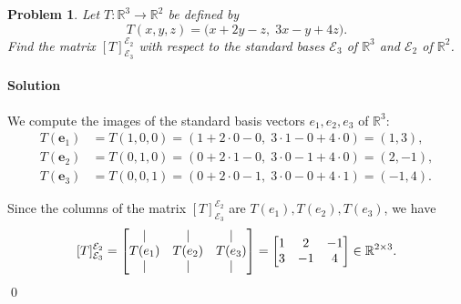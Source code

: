 \documentclass[11pt,openany]{article}
\newtheorem{problem}{Problem}
\renewcommand{\vec}[1]{\mathbf{#1}}
\newenvironment{solution}{\paragraph{\color{magenta}Solution}}{}
\begin{document}
\newpage
\begin{problem}
	Let $T:\mathbb{R}^3\to\mathbb{R}^2$ be defined by
	\[
	T(x,y,z)=\bigl(x+2y - z,\;3x - y +4z\bigr).
	\]
	Find the matrix $[T]_{\mathcal{E}_3}^{\mathcal{E}_2}$ with respect to the standard bases $\mathcal{E}_3$ of $\mathbb{R}^3$ and $\mathcal{E}_2$ of $\mathbb{R}^2$.
\end{problem}
\begin{solution}\color{white}
	We compute the images of the standard basis vectors \(e_1,e_2,e_3\) of \(\mathbb{R}^3\):	
	\begin{align*}
	T(\vec{e}_1) &= T(1,0,0) = (1 + 2\cdot0 - 0,\;3\cdot1 - 0 +4\cdot0) = (1,3),\\
	T(\vec{e}_2) &= T(0,1,0) = (0 + 2\cdot1 - 0,\;3\cdot0 - 1 +4\cdot0) = (2,-1),\\	
	T(\vec{e}_3) &= T(0,0,1) = (0 + 2\cdot0 - 1,\;3\cdot0 - 0 +4\cdot1) = (-1,4).
	\end{align*}
	
	Since the columns of the matrix \([T]_{\mathcal{E}_3}^{\mathcal{E}_2}\) are \(T(e_1),T(e_2),T(e_3)\), we have
	\[
	[T]_{\mathcal{E}_3}^{\mathcal{E}_2}
	=\begin{bmatrix}
		\mid & \mid & \mid \\
		T(e_1) & T(e_2) & T(e_3) \\
		\mid & \mid & \mid
	\end{bmatrix}
	=\begin{bmatrix}
		1 & 2 & -1\\
		3 & -1 & 4
	\end{bmatrix}\in \mathbb{R}^{2\times 3}.
	\]
\color{black}\vfill\hfill\qed
\end{solution}
\end{document}
